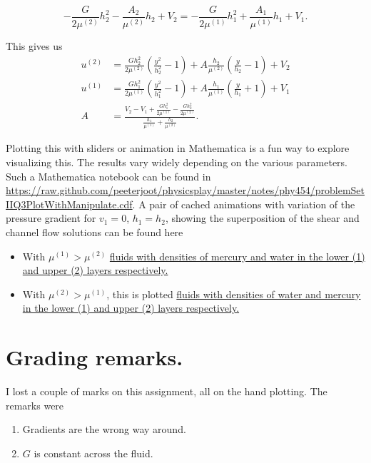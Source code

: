 \begin{equation}\label{eqn:continuumProblemSet2:n}
-\frac{G}{2 \mu^{(2)}}h_2^2 - \frac{A_2}{\mu^{(2)}} h_2 + V_2 = -\frac{G}{2 \mu^{(1)}}h_1^2 + \frac{A_1}{\mu^{(1)}} h_1 + V_1.
\end{equation}

This gives us
\begin{align}\label{eqn:continuumProblemSet2:n}
u^{(2)} &= \frac{G h_2^2}{2 \mu^{(2)}}\left(\frac{y^2}{h_2^2} - 1 \right) + A \frac{ h_2}{\mu^{(2)}} \left( \frac{y}{h_2} - 1 \right) + V_2 \\
u^{(1)} &= \frac{G h_1^2}{2 \mu^{(1)}}\left(\frac{y^2}{h_1^2} - 1 \right) + A \frac{ h_1}{\mu^{(1)}} \left( \frac{y}{h_1} + 1 \right) + V_1 \\
A 
&=
\frac{
V_2 - V_1
+ 
\frac{G h_1^2}{2 \mu^{(1)}}
-\frac{G h_2^2}{2 \mu^{(2)}}
}{
\frac{h_1}{\mu^{(1)}}
+\frac{h_2}{\mu^{(2)}}
}.
\end{align}

Plotting this with sliders or animation in Mathematica is a fun way to explore visualizing this.  The results vary widely depending on the various parameters.  Such a Mathematica notebook can be found in \href{https://raw.github.com/peeterjoot/physicsplay/master/notes/phy454/problemSetIIQ3PlotWithManipulate.cdf}{https://raw.github.com/peeterjoot/physicsplay/master/notes/phy454/problemSetIIQ3PlotWithManipulate.cdf}.  A pair of cached animations with variation of the pressure gradient for $v_1 = 0$, $h_1 = h_2$, showing the superposition of the shear and channel flow solutions can be found here

\begin{itemize}
\item With $\mu^{(1)} > \mu^{(2)}$ \href{http://youtu.be/2xVoFAL9XGA}{fluids with densities of mercury and water in the lower (1) and upper (2) layers respectively.}
\item With $\mu^{(2)} > \mu^{(1)}$, this is plotted \href{http://youtu.be/FJekyGf6XJw}{fluids with densities of water and mercury in the lower (1) and upper (2) layers respectively.}
\end{itemize}

\section{Grading remarks.}

I lost a couple of marks on this assignment, all on the hand plotting.  The remarks were

\begin{enumerate}
\item Gradients are the wrong way around.
\item $G$ is constant across the fluid.
\end{enumerate}

